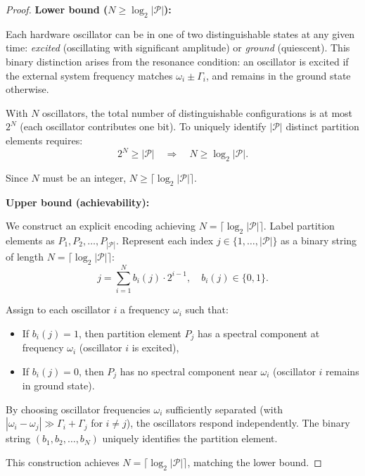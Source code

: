 \documentclass[twocolumn,10pt,a4paper]{article}
\theoremstyle{remark}
\newcommand{\partition}{\mathcal{P}}
\begin{document}
\begin{proof}
\textbf{Lower bound ($N \geq \log_2 |\partition|$):}

Each hardware oscillator can be in one of two distinguishable states at any given time: \emph{excited} (oscillating with significant amplitude) or \emph{ground} (quiescent). This binary distinction arises from the resonance condition: an oscillator is excited if the external system frequency matches $\omega_i \pm \Gamma_i$, and remains in the ground state otherwise.

With $N$ oscillators, the total number of distinguishable configurations is at most $2^N$ (each oscillator contributes one bit). To uniquely identify $|\partition|$ distinct partition elements requires:
\begin{equation}
2^N \geq |\partition| \quad \Rightarrow \quad N \geq \log_2 |\partition|.
\end{equation}

Since $N$ must be an integer, $N \geq \lceil \log_2 |\partition| \rceil$.

\textbf{Upper bound (achievability):}

We construct an explicit encoding achieving $N = \lceil \log_2 |\partition| \rceil$. Label partition elements as $P_1, P_2, \ldots, P_{|\partition|}$. Represent each index $j \in \{1, \ldots, |\partition|\}$ as a binary string of length $N = \lceil \log_2 |\partition| \rceil$:
\begin{equation}
j = \sum_{i=1}^N b_i(j) \cdot 2^{i-1}, \quad b_i(j) \in \{0, 1\}.
\end{equation}

Assign to each oscillator $i$ a frequency $\omega_i$ such that:
\begin{itemize}[noitemsep]
    \item If $b_i(j) = 1$, then partition element $P_j$ has a spectral component at frequency $\omega_i$ (oscillator $i$ is excited),
    \item If $b_i(j) = 0$, then $P_j$ has no spectral component near $\omega_i$ (oscillator $i$ remains in ground state).
\end{itemize}

By choosing oscillator frequencies $\omega_i$ sufficiently separated (with $|\omega_i - \omega_j| \gg \Gamma_i + \Gamma_j$ for $i \neq j$), the oscillators respond independently. The binary string $(b_1, b_2, \ldots, b_N)$ uniquely identifies the partition element.

This construction achieves $N = \lceil \log_2 |\partition| \rceil$, matching the lower bound.
\end{proof}
\end{document}
